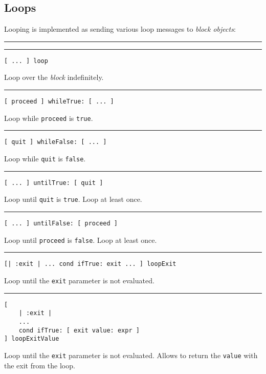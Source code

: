 \documentclass[10pt]{article}
\begin{document}
\begin{multicols*}{3}
\subsection{Loops}
Looping is implemented as sending various loop messages to \textit{block objects}:

\vspace*{0.2cm}
\hrule
\vspace*{0.03cm}
\hrule

\begin{lstlisting}
[ ... ] loop
\end{lstlisting}
Loop over the \textit{block} indefinitely.

\vspace*{0.2cm}
\hrule

\begin{lstlisting}
[ proceed ] whileTrue: [ ... ]
\end{lstlisting}
Loop while \texttt{proceed} is \texttt{true}.

\vspace*{0.2cm}
\hrule

\begin{lstlisting}
[ quit ] whileFalse: [ ... ]
\end{lstlisting}
Loop while \texttt{quit} is \texttt{false}.

\vspace*{0.2cm}
\hrule

\begin{lstlisting}
[ ... ] untilTrue: [ quit ]
\end{lstlisting}
Loop until \texttt{quit} is \texttt{true}. Loop at least once.

\vspace*{0.2cm}
\hrule

\begin{lstlisting}
[ ... ] untilFalse: [ proceed ]
\end{lstlisting}
Loop until \texttt{proceed} is \texttt{false}. Loop at least once.

\vspace*{0.2cm}
\hrule

\begin{lstlisting}
[| :exit | ... cond ifTrue: exit ... ] loopExit
\end{lstlisting}
Loop until the \texttt{exit} parameter is not evaluated.

\vspace*{0.2cm}
\hrule

\begin{lstlisting}
[
    | :exit |
    ...
    cond ifTrue: [ exit value: expr ]
] loopExitValue
\end{lstlisting}
Loop until the \texttt{exit} parameter is not evaluated. Allows to return the \texttt{value} with the exit from the loop.


\end{multicols*}
\end{document}
